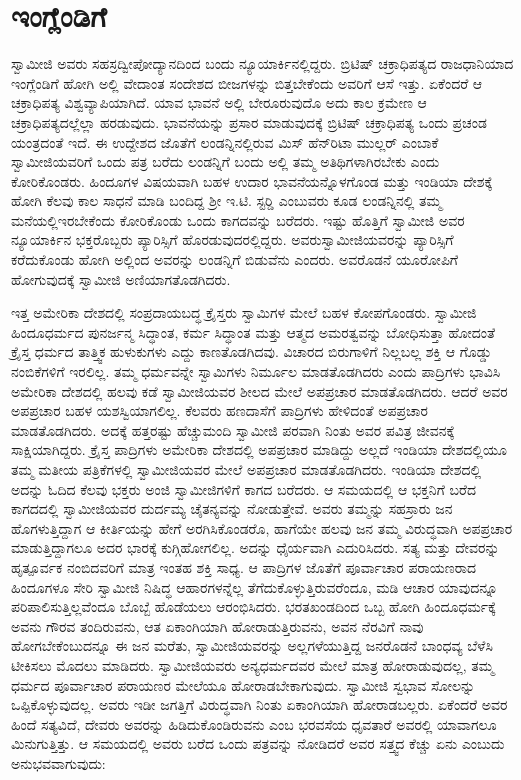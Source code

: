 
\chapter{ಇಂಗ್ಲೆಂಡಿಗೆ}

 ಸ್ವಾಮೀಜಿ ಅವರು ಸಹಸ್ರದ್ವೀಪೋದ್ಯಾನದಿಂದ ಬಂದು ನ್ಯೂಯಾರ್ಕಿನಲ್ಲಿದ್ದರು. ಬ್ರಿಟಿಷ್ ಚಕ್ರಾಧಿಪತ್ಯದ ರಾಜಧಾನಿಯಾದ ಇಂಗ್ಲೆಂಡಿಗೆ ಹೋಗಿ ಅಲ್ಲಿ ವೇದಾಂತ ಸಂದೇಶದ ಬೀಜಗಳನ್ನು ಬಿತ್ತಬೇಕೆಂದು ಅವರಿಗೆ ಆಸೆ ಇತ್ತು. ಏಕೆಂದರೆ ಆ ಚಕ್ರಾಧಿಪತ್ಯ ವಿಶ್ವವ್ಯಾಪಿಯಾಗಿದೆ. ಯಾವ ಭಾವನೆ ಅಲ್ಲಿ ಬೇರೂರುವುದೊ ಅದು ಕಾಲ ಕ್ರಮೇಣ ಆ ಚಕ್ರಾಧಿಪತ್ಯದಲ್ಲೆಲ್ಲಾ ಹರಡುವುದು. ಭಾವನೆಯನ್ನು ಪ್ರಸಾರ ಮಾಡುವುದಕ್ಕೆ ಬ್ರಿಟಿಷ್ ಚಕ್ರಾಧಿಪತ್ಯ ಒಂದು ಪ್ರಚಂಡ ಯಂತ್ರದಂತೆ ಇದೆ. ಈ ಉದ್ದೇಶದ ಜೊತೆಗೆ ಲಂಡನ್ನಿನಲ್ಲಿರುವ ಮಿಸ್ ಹೆನ್‍ರಿಟಾ ಮುಲ್ಲರ್ ಎಂಬಾಕೆ ಸ್ವಾಮೀಜಿಯವರಿಗೆ ಒಂದು ಪತ್ರ ಬರೆದು ಲಂಡನ್ನಿಗೆ ಬಂದು ಅಲ್ಲಿ ತಮ್ಮ ಅತಿಥಿಗಳಾಗಿರಬೇಕು ಎಂದು ಕೋರಿಕೊಂಡರು. ಹಿಂದೂಗಳ ವಿಷಯವಾಗಿ ಬಹಳ ಉದಾರ ಭಾವನೆಯನ್ನೊಳಗೊಂಡ ಮತ್ತು ಇಂಡಿಯಾ ದೇಶಕ್ಕೆ ಹೋಗಿ ಕೆಲವು ಕಾಲ ಸಾಧನೆ ಮಾಡಿ ಬಂದಿದ್ದ ಶ‍್ರೀ ಇ.ಟಿ. ಸ್ಟರ‍್ಡಿ ಎಂಬುವರು ಕೂಡ ಲಂಡನ್ನಿನಲ್ಲಿ ತಮ್ಮ ಮನೆಯಲ್ಲಿ\break ಇರಬೇಕೆಂದು ಕೋರಿಕೊಂಡು ಒಂದು ಕಾಗದವನ್ನು ಬರೆದರು. ಇಷ್ಟು ಹೊತ್ತಿಗೆ ಸ್ವಾಮೀಜಿ ಅವರ ನ್ಯೂಯಾರ್ಕಿನ ಭಕ್ತರೊಬ್ಬರು ಪ್ಯಾರಿಸ್ಸಿಗೆ ಹೊರಡುವುದರಲ್ಲಿದ್ದರು. ಅವರು\break ಸ್ವಾಮೀಜಿಯವರನ್ನು ಪ್ಯಾರಿಸ್ಸಿಗೆ ಕರೆದುಕೊಂಡು ಹೋಗಿ ಅಲ್ಲಿಂದ ಅವರನ್ನು ಲಂಡನ್ನಿಗೆ ಬಿಡುವೆನು ಎಂದರು. ಅವರೊಡನೆ ಯೂರೋಪಿಗೆ ಹೋಗುವುದಕ್ಕೆ ಸ್ವಾಮೀಜಿ ಅಣಿಯಾಗತೊಡಗಿದರು. 

 ಇತ್ತ ಅಮೇರಿಕಾ ದೇಶದಲ್ಲಿ ಸಂಪ್ರದಾಯಬದ್ಧ ಕ್ರೈಸ್ತರು ಸ್ವಾಮಿಗಳ ಮೇಲೆ ಬಹಳ ಕೋಪಗೊಂಡರು. ಸ್ವಾಮೀಜಿ ಹಿಂದೂಧರ್ಮದ ಪುನರ್ಜನ್ಮ ಸಿದ್ಧಾಂತ, ಕರ್ಮ ಸಿದ್ಧಾಂತ ಮತ್ತು ಆತ್ಮದ ಅಮರತ್ವವನ್ನು ಬೋಧಿಸುತ್ತಾ ಹೋದಂತೆ ಕ್ರೈಸ್ತ ಧರ್ಮದ ತಾತ್ತ್ವಿಕ ಹುಳುಕುಗಳು ಎದ್ದು ಕಾಣತೊಡಗಿದವು. ವಿಚಾರದ ಬಿರುಗಾಳಿಗೆ ನಿಲ್ಲಬಲ್ಲ ಶಕ್ತಿ ಆ ಗೊಡ್ಡು ನಂಬಿಕೆಗಳಿಗೆ ಇರಲಿಲ್ಲ. ತಮ್ಮ ಧರ್ಮವನ್ನೇ ಸ್ವಾಮಿಗಳು ನಿರ್ಮೂಲ ಮಾಡತೊಡಗಿದರು ಎಂದು ಪಾದ್ರಿಗಳು ಭಾವಿಸಿ ಅಮೇರಿಕಾ ದೇಶದಲ್ಲಿ ಹಲವು ಕಡೆ ಸ್ವಾಮೀಜಿಯವರ ಶೀಲದ ಮೇಲೆ ಅಪಪ್ರಚಾರ ಮಾಡತೊಡಗಿದರು. ಆದರೆ ಅವರ ಅಪಪ್ರಚಾರ ಬಹಳ ಯಶಸ್ವಿಯಾಗಲಿಲ್ಲ. ಕೆಲವರು ಹಣದಾಸೆಗೆ ಪಾದ್ರಿಗಳು ಹೇಳಿದಂತೆ ಅಪಪ್ರಚಾರ ಮಾಡತೊಡಗಿದರು. ಅದಕ್ಕೆ ಹತ್ತರಷ್ಟು ಹೆಚ್ಚುಮಂದಿ ಸ್ವಾಮೀಜಿ ಪರವಾಗಿ ನಿಂತು ಅವರ ಪವಿತ್ರ ಜೀವನಕ್ಕೆ ಸಾಕ್ಷಿಯಾಗಿದ್ದರು. ಕ್ರೈಸ್ತ ಪಾದ್ರಿಗಳು ಅಮೇರಿಕಾ ದೇಶದಲ್ಲಿ ಅಪಪ್ರಚಾರ ಮಾಡಿದ್ದು ಅಲ್ಲದೆ ಇಂಡಿಯಾ ದೇಶದಲ್ಲಿಯೂ ತಮ್ಮ ಮತೀಯ ಪತ್ರಿಕೆಗಳಲ್ಲಿ ಸ್ವಾಮೀಜಿಯವರ ಮೇಲೆ ಅಪಪ್ರಚಾರ ಮಾಡತೊಡಗಿದರು. ಇಂಡಿಯಾ ದೇಶದಲ್ಲಿ ಅದನ್ನು ಓದಿದ ಕೆಲವು ಭಕ್ತರು ಅಂಜಿ ಸ್ವಾಮೀಜಿಗಳಿಗೆ ಕಾಗದ ಬರೆದರು. ಆ ಸಮಯದಲ್ಲಿ ಆ ಭಕ್ತನಿಗೆ ಬರೆದ ಕಾಗದದಲ್ಲಿ ಸ್ವಾಮೀಜಿಯವರ ದುರ್ದಮ್ಯ ಚೈತನ್ಯವನ್ನು ನೋಡುತ್ತೇವೆ. ಅವರು ತಮ್ಮನ್ನು ಸಹಸ್ರಾರು ಜನ ಹೊಗಳುತ್ತಿದ್ದಾಗ ಆ ಕೀರ್ತಿಯನ್ನು ಹೇಗೆ ಅರಗಿಸಿಕೊಂಡರೊ, ಹಾಗೆಯೇ ಹಲವು ಜನ ತಮ್ಮ ವಿರುದ್ಧವಾಗಿ ಅಪಪ್ರಚಾರ ಮಾಡುತ್ತಿದ್ದಾಗಲೂ ಅದರ ಭಾರಕ್ಕೆ ಕುಗ್ಗಿಹೋಗಲಿಲ್ಲ. ಅದನ್ನು ಧೈರ್ಯವಾಗಿ ಎದುರಿಸಿದರು. ಸತ್ಯ ಮತ್ತು ದೇವರನ್ನು ಹೃತ್ಪೂರ್ವಕ ನಂಬಿದವರಿಗೆ ಮಾತ್ರ ಇಂತಹ ಶಕ್ತಿ ಸಾಧ್ಯ. ಆ ಪಾದ್ರಿಗಳ ಜೊತೆಗೆ ಪೂರ್ವಾಚಾರ ಪರಾಯಣರಾದ ಹಿಂದೂಗಳೂ ಸೇರಿ ಸ್ವಾಮೀಜಿ ನಿಷಿದ್ಧ ಆಹಾರಗಳನ್ನೆಲ್ಲ ತೆಗೆದುಕೊಳ್ಳುತ್ತಿರುವರೆಂದೂ, ಮಡಿ ಆಚಾರ ಯಾವುದನ್ನೂ ಪರಿಪಾಲಿಸುತ್ತಿಲ್ಲವೆಂದೂ ಬೊಬ್ಬೆ ಹೊಡೆಯಲು ಆರಂಭಿಸಿದರು. ಭರತಖಂಡದಿಂದ ಒಬ್ಬ ಹೋಗಿ ಹಿಂದೂಧರ್ಮಕ್ಕೆ ಅವನು ಗೌರವ ತಂದಿರುವನು, ಆತ ಏಕಾಂಗಿಯಾಗಿ ಹೋರಾಡುತ್ತಿರುವನು, ಅವನ ನೆರವಿಗೆ ನಾವು ಹೋಗಬೇಕೆಂಬುದನ್ನೂ ಈ ಜನ ಮರೆತು, ಸ್ವಾಮೀಜಿಯವರನ್ನು ಅಲ್ಲಗಳೆಯುತ್ತಿದ್ದ ಜನರೊಡನೆ ಬಾಂಧವ್ಯ ಬೆಳೆಸಿ ಟೀಕಿಸಲು ಮೊದಲು ಮಾಡಿದರು. ಸ್ವಾಮೀಜಿಯವರು ಅನ್ಯಧರ್ಮದವರ ಮೇಲೆ ಮಾತ್ರ ಹೋರಾಡುವುದಲ್ಲ, ತಮ್ಮ ಧರ್ಮದ ಪೂರ್ವಾಚಾರ ಪರಾಯಣರ ಮೇಲೆಯೂ ಹೋರಾಡಬೇಕಾಗುವುದು. ಸ್ವಾಮೀಜಿ ಸ್ವಭಾವ ಸೋಲನ್ನು ಒಪ್ಪಿಕೊಳ್ಳುವುದಲ್ಲ. ಅವರು ಇಡೀ ಜಗತ್ತಿಗೆ ವಿರುದ್ಧವಾಗಿ ನಿಂತು ಏಕಾಂಗಿಯಾಗಿ ಹೋರಾಡಬಲ್ಲರು. ಏಕೆಂದರೆ ಅವರ ಹಿಂದೆ ಸತ್ಯವಿದೆ, ದೇವರು ಅವರನ್ನು ಹಿಡಿದುಕೊಂಡಿರುವನು ಎಂಬ ಭರವಸೆಯ ಧೃವತಾರೆ ಅವರಲ್ಲಿ ಯಾವಾಗಲೂ ಮಿನುಗುತ್ತಿತ್ತು. ಆ ಸಮಯದಲ್ಲಿ ಅವರು ಬರೆದ ಒಂದು ಪತ್ರವನ್ನು ನೋಡಿದರೆ ಅವರ ಸತ್ತ್ವದ ಕೆಚ್ಚು ಏನು ಎಂಬುದು ಅನುಭವವಾಗುವುದು: 


